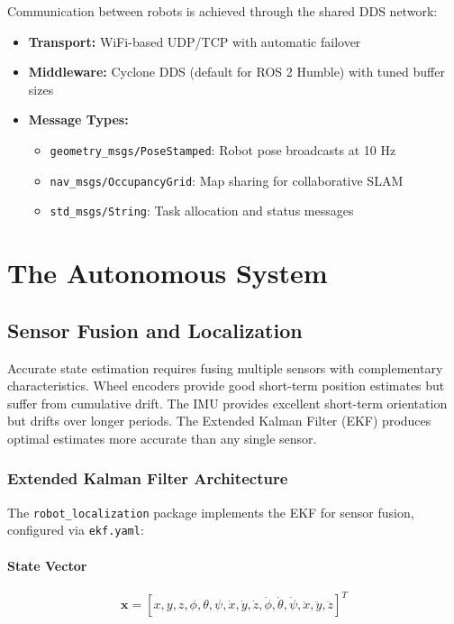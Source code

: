 Communication between robots is achieved through the shared DDS network:

\begin{itemize}
    \item \textbf{Transport:} WiFi-based UDP/TCP with automatic failover
    \item \textbf{Middleware:} Cyclone DDS (default for ROS 2 Humble) with tuned buffer sizes
    \item \textbf{Message Types:}
    \begin{itemize}
        \item \texttt{geometry\_msgs/PoseStamped}: Robot pose broadcasts at 10 Hz
        \item \texttt{nav\_msgs/OccupancyGrid}: Map sharing for collaborative SLAM
        \item \texttt{std\_msgs/String}: Task allocation and status messages
    \end{itemize}
\end{itemize}


\section{The Autonomous System}
\label{sec:autonomous_system}

\subsection{Sensor Fusion and Localization}
\label{subsec:localization}

Accurate state estimation requires fusing multiple sensors with complementary characteristics. Wheel encoders provide good short-term position estimates but suffer from cumulative drift. The IMU provides excellent short-term orientation but drifts over longer periods. The Extended Kalman Filter (EKF) produces optimal estimates more accurate than any single sensor.

\subsubsection{Extended Kalman Filter Architecture}

The \texttt{robot\_localization} package implements the EKF for sensor fusion, configured via \texttt{ekf.yaml}:

\paragraph{State Vector}
\begin{equation}
\mathbf{x} = [x, y, z, \phi, \theta, \psi, \dot{x}, \dot{y}, \dot{z}, \dot{\phi}, \dot{\theta}, \dot{\psi}, \ddot{x}, \ddot{y}, \ddot{z}]^T
\label{eq:state_vector}
\end{equation}

